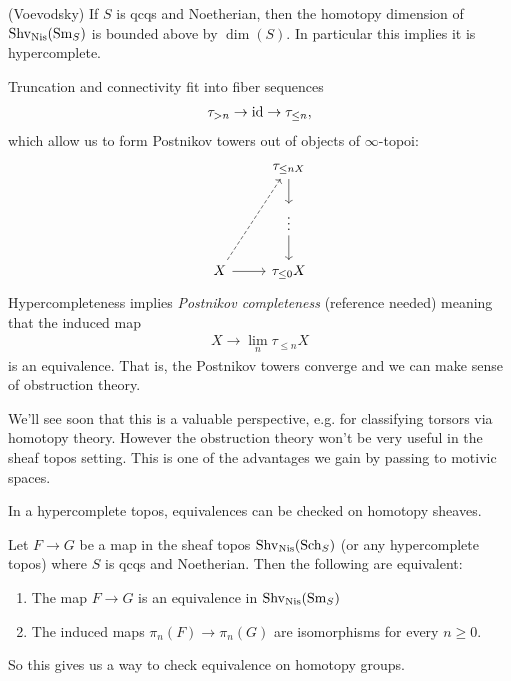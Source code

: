 \documentclass[11pt,openany]{book}
\begin{document}
\begin{theorem} (Voevodsky) If $S$ is qcqs and Noetherian, then the homotopy dimension of $\mathrm{Shv}_{\mathrm{Nis}}(\mathrm{Sm}_S)$ is bounded above by $\dim(S)$. In particular this implies it is hypercomplete.
\end{theorem}

Truncation and connectivity fit into fiber sequences
\begin{align*}
    \tau_{>n} \to \mathrm{id} \to \tau_{\le n},
\end{align*}
which allow us to form Postnikov towers out of objects of $\infty$-topoi:
\[ \begin{tikzcd}
    & \tau_{\le n X}\dar \\
    & \vdots\dar\\
    X\rar\ar[uur,dashed] & \tau_{\le 0} X
\end{tikzcd} \]
Hypercompleteness implies \textit{Postnikov completeness} (reference needed) meaning that the induced map
\begin{align*}
    X \to \lim_n \tau_{\le n} X
\end{align*}
is an equivalence. That is, the Postnikov towers converge and we can make sense of obstruction theory.

We'll see soon that this is a valuable perspective, e.g. for classifying torsors via homotopy theory. However the obstruction theory won't be very useful in the sheaf topos setting. This is one of the advantages we gain by passing to motivic spaces.

\begin{upshot} In a hypercomplete topos, equivalences can be checked on homotopy sheaves.
\end{upshot}

\begin{corollary}\label{cor:equivalence-in-hypercomplete-topos} 
Let $F \to G$ be a map in the sheaf topos $\mathrm{Shv}_{\mathrm{Nis}}(\mathrm{Sch}_S)$ (or any hypercomplete topos) where $S$ is qcqs and Noetherian. Then the following are equivalent:
\begin{enumerate}
    \item The map $F \to G$ is an equivalence in $\mathrm{Shv}_{\mathrm{Nis}}(\mathrm{Sm}_S)$
    \item The induced maps $\pi_n(F) \to \pi_n(G)$ are isomorphisms for every $n\ge 0$.
\end{enumerate}
\end{corollary}

So this gives us a way to check equivalence on homotopy groups.
\end{document}
